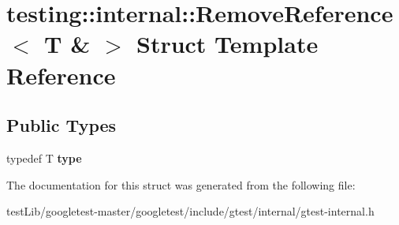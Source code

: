 \hypertarget{structtesting_1_1internal_1_1RemoveReference_3_01T_01_6_01_4}{}\section{testing\+:\+:internal\+:\+:Remove\+Reference$<$ T \& $>$ Struct Template Reference}
\label{structtesting_1_1internal_1_1RemoveReference_3_01T_01_6_01_4}
\subsection*{Public Types}
\begin{DoxyCompactItemize}
\item 
\mbox{\label{structtesting_1_1internal_1_1RemoveReference_3_01T_01_6_01_4_a3d0f32a66759f333c2dd66aa31005e6d}} 
typedef T {\bfseries type}
\end{DoxyCompactItemize}


The documentation for this struct was generated from the following file\+:\begin{DoxyCompactItemize}
\item 
test\+Lib/googletest-\/master/googletest/include/gtest/internal/gtest-\/internal.\+h\end{DoxyCompactItemize}
